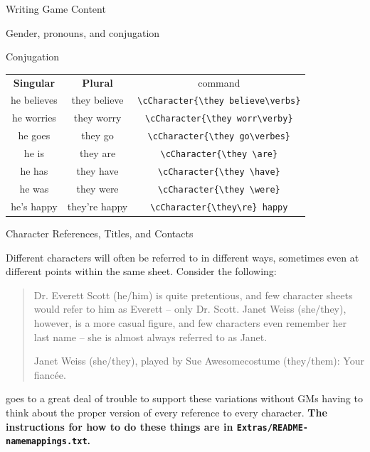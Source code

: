 \documentclass[sheet]{GameTexBase}
\begin{document}
\begin{section}{Writing Game Content}
\begin{subsection}{Gender, pronouns, and conjugation}
\begin{subsubsection}{Conjugation}
\begin{center}
\begin{tabular}{c|c|c}
\textbf{Singular} & \textbf{Plural} & \lrstex{} command\\
he believes & they believe & \lstinline|\cCharacter{\they believe\verbs}| \\
he worries & they worry & \lstinline|\cCharacter{\they worr\verby}| \\
he goes & they go & \lstinline|\cCharacter{\they go\verbes}| \\
he is & they are & \lstinline|\cCharacter{\they \are}| \\
he has & they have & \lstinline|\cCharacter{\they \have}| \\
he was & they were & \lstinline|\cCharacter{\they \were}| \\
he's happy & they're happy & \lstinline|\cCharacter{\they\re} happy|
\end{tabular}
\end{center}
\end{subsubsection}
\end{subsection}
\begin{subsection}{Character References, Titles, and Contacts}
\label{charintro}
\label{charcontacts}

Different characters will often be referred to in different ways, sometimes even at different points within the same sheet.  Consider the following:

\begin{quote}
Dr. Everett Scott (he/him) is quite pretentious, and few character sheets would refer to him as Everett -- only Dr. Scott.  Janet Weiss (she/they), however, is a more casual figure, and few characters even remember her last name -- she is almost always referred to as Janet.

\begin{itemz}[Contacts]
\item Janet Weiss (she/they), played by Sue Awesomecostume (they/them): Your fianc\'ee.
\end{itemz}
\end{quote}

\gametex{} goes to a great deal of trouble to support these variations without GMs having to think about the proper version of every reference to every character.  \textbf{The instructions for how to do these things are in \texttt{Extras/README-namemappings.txt}.}


\end{subsection}
\end{section}
\end{document}
